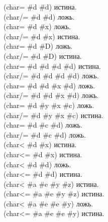 \begin{defun}[Function]
\begin{lisp}
(char= \#{\Xbackslash}d \#{\Xbackslash}d) \textrm{истина.} \\
(char/= \#{\Xbackslash}d \#{\Xbackslash}d) \textrm{ложь.} \\
(char= \#{\Xbackslash}d \#{\Xbackslash}x) \textrm{ложь.} \\
(char/= \#{\Xbackslash}d \#{\Xbackslash}x) \textrm{истина.} \\
(char= \#{\Xbackslash}d \#{\Xbackslash}D) \textrm{ложь.} \\
(char/= \#{\Xbackslash}d \#{\Xbackslash}D) \textrm{истина.} \\
(char= \#{\Xbackslash}d \#{\Xbackslash}d \#{\Xbackslash}d \#{\Xbackslash}d) \textrm{истина.} \\
(char/= \#{\Xbackslash}d \#{\Xbackslash}d \#{\Xbackslash}d \#{\Xbackslash}d) \textrm{ложь.} \\
(char= \#{\Xbackslash}d \#{\Xbackslash}d \#{\Xbackslash}x \#{\Xbackslash}d) \textrm{ложь.} \\
(char/= \#{\Xbackslash}d \#{\Xbackslash}d \#{\Xbackslash}x \#{\Xbackslash}d) \textrm{ложь.} \\
(char= \#{\Xbackslash}d \#{\Xbackslash}y \#{\Xbackslash}x \#{\Xbackslash}c) \textrm{ложь.} \\
(char/= \#{\Xbackslash}d \#{\Xbackslash}y \#{\Xbackslash}x \#{\Xbackslash}c) \textrm{истина.} \\
(char= \#{\Xbackslash}d \#{\Xbackslash}c \#{\Xbackslash}d) \textrm{ложь.} \\
(char/= \#{\Xbackslash}d \#{\Xbackslash}c \#{\Xbackslash}d) \textrm{ложь.} \\
(char< \#{\Xbackslash}d \#{\Xbackslash}x) \textrm{истина.} \\
(char<= \#{\Xbackslash}d \#{\Xbackslash}x) \textrm{истина.} \\
(char< \#{\Xbackslash}d \#{\Xbackslash}d) \textrm{ложь.} \\
(char<= \#{\Xbackslash}d \#{\Xbackslash}d) \textrm{истина.} \\
(char< \#{\Xbackslash}a \#{\Xbackslash}e \#{\Xbackslash}y \#{\Xbackslash}z) \textrm{истина.} \\
(char<= \#{\Xbackslash}a \#{\Xbackslash}e \#{\Xbackslash}y \#{\Xbackslash}z) \textrm{истина.} \\
(char< \#{\Xbackslash}a \#{\Xbackslash}e \#{\Xbackslash}e \#{\Xbackslash}y) \textrm{ложь.} \\
(char<= \#{\Xbackslash}a \#{\Xbackslash}e \#{\Xbackslash}e \#{\Xbackslash}y) \textrm{истина.} \\

\end{lisp}
\end{defun}

